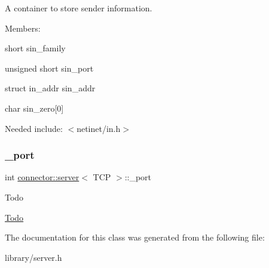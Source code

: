 A container to store sender information. 

Members\+:
\begin{DoxyItemize}
\item {\ttfamily short} sin\+\_\+family
\item {\ttfamily unsigned short} sin\+\_\+port
\item {\ttfamily struct} in\+\_\+addr sin\+\_\+addr
\item {\ttfamily char} sin\+\_\+zero\mbox{[}0\mbox{]}
\end{DoxyItemize}

Needed include\+: {\ttfamily $<$netinet/in.\+h$>$} \mbox{\label{classconnector_1_1server_3_01TCP_01_4_a0131d121d7342e0020a6c8839f0ed510}} 
\subsubsection{\texorpdfstring{\+\_\+port}{\_port}}
{\footnotesize\ttfamily int \hyperlink{classconnector_1_1server}{connector\+::server}$<$ T\+CP $>$\+::\+\_\+port\hspace{0.3cm}{\ttfamily [private]}}

\begin{DoxyRefDesc}{Todo}
\item[\hyperlink{todo__todo000013}{Todo}]\end{DoxyRefDesc}


The documentation for this class was generated from the following file\+:\begin{DoxyCompactItemize}
\item 
library/server.\+h\end{DoxyCompactItemize}
